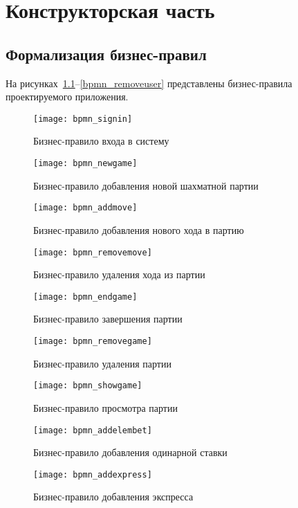 \chapter{Конструкторская часть}

\section{Формализация бизнес-правил}

На рисунках~\ref{bpmn_signin}--\ref{bpmn_removeuser} представлены бизнес-правила проектируемого приложения.
\begin{figure}[H]
	\centering
	\texttt{[image: bpmn\_signin]}
	\caption{Бизнес-правило входа в систему}
	\label{bpmn_signin}
\end{figure}
\begin{figure}[H]
	\centering
	\texttt{[image: bpmn\_newgame]}
	\caption{Бизнес-правило добавления новой шахматной партии}
	\label{bpmn_newgame}
\end{figure}
\begin{figure}[H]
	\centering
	\texttt{[image: bpmn\_addmove]}
	\caption{Бизнес-правило добавления нового хода в партию}
	\label{bpmn_addmove}
\end{figure}
\begin{figure}[H]
	\centering
	\texttt{[image: bpmn\_removemove]}
	\caption{Бизнес-правило удаления хода из партии}
	\label{bpmn_removemove}
\end{figure}
\begin{figure}[H]
	\centering
	\texttt{[image: bpmn\_endgame]}
	\caption{Бизнес-правило завершения партии}
	\label{bpmn_endgame}
\end{figure}
\begin{figure}[H]
	\centering
	\texttt{[image: bpmn\_removegame]}
	\caption{Бизнес-правило удаления партии}
	\label{bpmn_removegame}
\end{figure}
\begin{figure}[H]
	\centering
	\texttt{[image: bpmn\_showgame]}
	\caption{Бизнес-правило просмотра партии}
	\label{bpmn_showgame}
\end{figure}
\begin{figure}[H]
	\centering
	\texttt{[image: bpmn\_addelembet]}
	\caption{Бизнес-правило добавления одинарной ставки}
	\label{bpmn_addelembet}
\end{figure}
\begin{figure}[H]
	\centering
	\texttt{[image: bpmn\_addexpress]}
	\caption{Бизнес-правило добавления экспресса}
	\label{bpmn_addexpress}
\end{figure}
